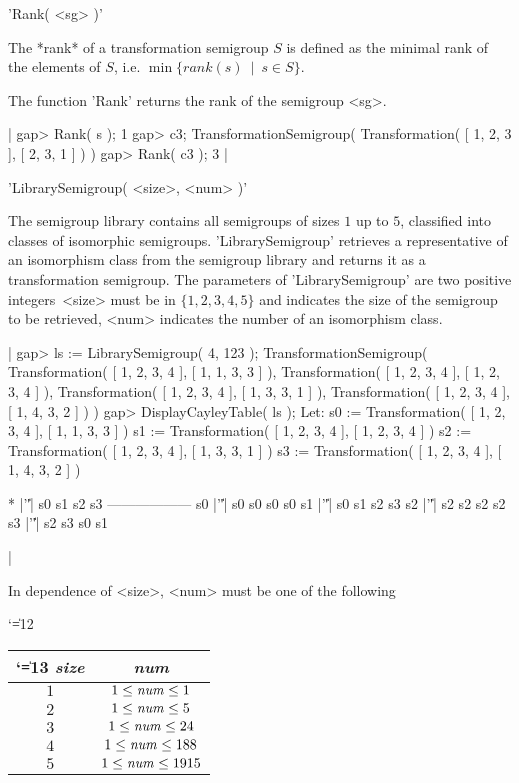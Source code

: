 'Rank( <sg> )'  

The *rank* of a transformation semigroup $S$ is defined as the minimal
rank of the elements of $S$, i.e. $\min\{ rank(s)\ \mid\ s \in S \}$.

The function 'Rank' returns the rank of the semigroup <sg>.

|  gap> Rank( s );
  1
  gap> c3;
  TransformationSemigroup( Transformation( [ 1, 2, 3 ], [ 2, 3, 1 ] ) ) 
  gap> Rank( c3 );
  3
|



'LibrarySemigroup( <size>, <num> )'  

The semigroup library contains all semigroups of sizes $1$ up to $5$,
classified into classes of isomorphic semigroups.
'LibrarySemigroup' retrieves a representative of an isomorphism class 
from the semigroup library and returns it as a transformation semigroup.
The parameters of 'LibrarySemigroup' are two positive integers\:\ 
<size> must be in $\{1,2,3,4,5\}$ and indicates the size of the semigroup 
to be retrieved, <num> indicates the number of an isomorphism class.

|  gap> ls := LibrarySemigroup( 4, 123 );
  TransformationSemigroup( Transformation( [ 1, 2, 3, 4 ], 
  [ 1, 1, 3, 3 ] ), Transformation( [ 1, 2, 3, 4 ], 
  [ 1, 2, 3, 4 ] ), Transformation( [ 1, 2, 3, 4 ], 
  [ 1, 3, 3, 1 ] ), Transformation( [ 1, 2, 3, 4 ], [ 1, 4, 3, 2 ] ) ) 
  gap> DisplayCayleyTable( ls );
  Let:
  s0 := Transformation( [ 1, 2, 3, 4 ], [ 1, 1, 3, 3 ] )
  s1 := Transformation( [ 1, 2, 3, 4 ], [ 1, 2, 3, 4 ] )
  s2 := Transformation( [ 1, 2, 3, 4 ], [ 1, 3, 3, 1 ] )
  s3 := Transformation( [ 1, 2, 3, 4 ], [ 1, 4, 3, 2 ] )


    *  |'\|'|  s0 s1 s2 s3 
   ------------------
    s0 |'\|'| s0 s0 s0 s0 
    s1 |'\|'| s0 s1 s2 s3 
    s2 |'\|'| s2 s2 s2 s2 
    s3 |'\|'| s2 s3 s0 s1 

|

In dependence of <size>, <num> must be one of the following\:\ 
\begin{center}
\catcode`\|=12  \begin{tabular}{|c|c|} \hline \catcode`\|=13  
{\it size} & {\it num}  \\
\hline
$1$ & $1 \le {\it num} \le 1$ \\
$2$ & $1 \le {\it num} \le 5$ \\
$3$ & $1 \le {\it num} \le 24$ \\
$4$ & $1 \le {\it num} \le 188$ \\
$5$ & $1 \le {\it num} \le 1915$ \\
\hline
\end{tabular} 
\end{center}

